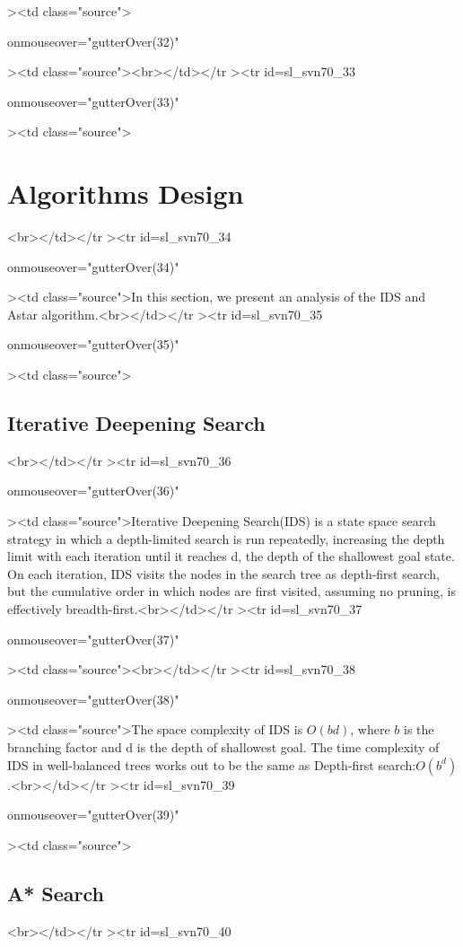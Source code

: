 ><td class="source">\documentclass[letterpaper]{article}<br></td></tr
\begin{document}
 onmouseover="gutterOver(32)"

><td class="source"><br></td></tr
><tr
id=sl_svn70_33

 onmouseover="gutterOver(33)"

><td class="source">\section{Algorithms Design}<br></td></tr
><tr
id=sl_svn70_34

 onmouseover="gutterOver(34)"

><td class="source">In this section, we present an analysis of the IDS and Astar algorithm.<br></td></tr
><tr
id=sl_svn70_35

 onmouseover="gutterOver(35)"

><td class="source">\subsection{Iterative Deepening Search}<br></td></tr
><tr
id=sl_svn70_36

 onmouseover="gutterOver(36)"

><td class="source">Iterative Deepening Search(IDS) is a state space search strategy in which a depth-limited search is run repeatedly, increasing the depth limit with each iteration until it reaches d, the depth of the shallowest goal state. On each iteration, IDS visits the nodes in the search tree as depth-first search, but the cumulative order in which nodes are first visited, assuming no pruning, is effectively breadth-first.<br></td></tr
><tr
id=sl_svn70_37

 onmouseover="gutterOver(37)"

><td class="source"><br></td></tr
><tr
id=sl_svn70_38

 onmouseover="gutterOver(38)"

><td class="source">The space complexity of IDS is $O(bd)$, where $b$ is the branching factor and d is the depth of shallowest goal. The time complexity of IDS in well-balanced trees works out to be the same as Depth-first search:$O(b^{d})$.<br></td></tr
><tr
id=sl_svn70_39

 onmouseover="gutterOver(39)"

><td class="source">\subsection{A* Search}<br></td></tr
><tr
id=sl_svn70_40
\end{document}
